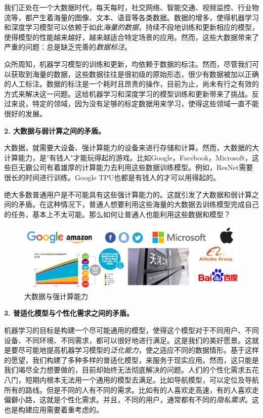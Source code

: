我们正处在一个大数据时代，每天每时，社交网络、智能交通、视频监控、行业物流等，都产生着海量的图像、文本、语音等各类数据。数据的增多，使得机器学习和深度学习模型可以依赖于如此\textit{海量的数据}，持续不段地训练和更新相应的模型，使得模型的性能越来越好，越来越适合特定场景的应用。然而，这些大数据带来了严重的问题：总是缺乏完善的\textit{数据标注}。

众所周知，机器学习模型的训练和更新，均依赖于数据的标注。然而，尽管我们可以获取到海量的数据，这些数据往往是很初级的原始形态，很少有数据被加以正确的人工标注。数据的标注是一个耗时且昂贵的操作，目前为止，尚未有行之有效的方式来解决这一问题。这给机器学习和深度学习的模型训练和更新带来了挑战。反过来说，特定的领域，因为没有足够的标定数据用来学习，使得这些领域一直不能很好的发展。

\textbf{2. 大数据与弱计算之间的矛盾。}

大数据，就需要大设备、强计算能力的设备来进行存储和计算。然而，大数据的大计算能力，是"有钱人"才能玩得起的游戏。比如Google，Facebook，Microsoft，这些巨无霸公司有着雄厚的计算能力去利用这些数据训练模型。例如，ResNet需要很长的时间进行训练。Google TPU也都是有钱人的才可以用得起的。

绝大多数普通用户是不可能具有这些强计算能力的。这就引发了大数据和弱计算之间的矛盾。在这种情况下，普通人想要利用这些海量的大数据去训练模型完成自己的任务，基本上不太可能。那么如何让普通人也能利用这些数据和模型？

\begin{figure}[htbp]
	\centering
	\includegraphics[scale=0.42]{./figures/fig-introduction-bigdata.pdf}
	\caption{大数据与强计算能力}
	\label{fig-bigdata}
\end{figure}

\textbf{3. 普适化模型与个性化需求之间的矛盾。}

机器学习的目标是构建一个尽可能通用的模型，使得这个模型对于不同用户、不同设备、不同环境、不同需求，都可以很好地进行满足。这是我们的美好愿景。这就是要尽可能地提高机器学习模型的\textit{泛化能力}，使之适应不同的数据情形。基于这样的愿望，我们构建了多种多样的普适化模型，来服务于现实应用。然而，这只能是我们竭尽全力想要做的，目前却始终无法彻底解决的问题。人们的个性化需求五花八门，短期内根本无法用一个通用的模型去满足。比如导航模型，可以定位及导航所有的路线。但是不同的人有不同的需求。比如有的人喜欢走高速，有的人喜欢走偏僻小路，这就是个性化需求。并且，不同的用户，通常都有不同的\textit{隐私需求}。这也是构建应用需要着重考虑的。


